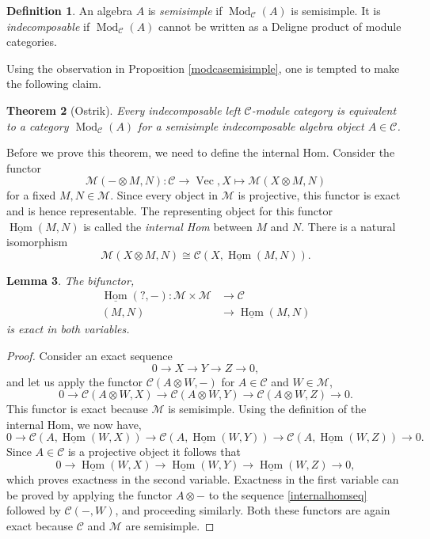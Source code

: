 \documentclass[11pt]{book}
\newtheorem{theorem}{Theorem}[section]
\newtheorem{Lem}[theorem]{Lemma}
\theoremstyle{Rem}
\theoremstyle{definition}
\newtheorem{Def}[theorem]{Definition}
\numberwithin{equation}{section}
\newcommand\ot{\otimes}
\newcommand\Vect{\operatorname{Vec}}
\newcommand\Hom{\operatorname{Hom}}
\newcommand\Mod{\operatorname{Mod}}
\newcommand\M{\mathcal{M}}
\newcommand\C{\mathcal C}
\newcommand{\ra}\rightarrow
\begin{document}
\begin{Def}
An algebra $A$ is \textit{semisimple} if $\Mod_\C(A)$ is semisimple. It is \textit{indecomposable} if $\Mod_\C(A)$ cannot be written as a Deligne product of module categories. 
\end{Def}
Using the observation in Proposition \ref{modcasemisimple}, one is tempted to make the following claim. \begin{theorem}[Ostrik]\label{Ostrik}
Every indecomposable left $\C$-module category is equivalent to a category $\Mod_\C(A)$ for a semisimple indecomposable algebra object $A\in\C$.
\end{theorem}
Before we prove this theorem, we need to define the internal Hom. 
Consider the functor \begin{equation}
	\M(-\otimes M, N): \C\rightarrow \Vect, X\mapsto \M(X\otimes M, N) 
\end{equation} for a fixed $M, N\in \M$.
Since every object in $\M$ is projective, this functor is exact and is hence representable. The representing object for this functor $\underline{\Hom}(M, N)$ is called the \textit{internal Hom} between $M$ and $N$. There is a natural isomorphism \begin{equation}
	\M(X\otimes M, N) \cong \C(X, \underline{\Hom}(M, N)).\label{internalhomiso}
\end{equation}
\begin{Lem}
 The bifunctor, \begin{align}
 \underline{\Hom} (?, -) : \M\times \M &\rightarrow \C\\
	(M, N) &\rightarrow \underline{\Hom}(M, N)
\end{align} is exact in both variables.
 \end{Lem} 
 \begin{proof}
 Consider an exact sequence \begin{equation}\label{internalhomseq}
	0\ra X\ra Y \ra Z \ra 0,
\end{equation}and let us apply the functor  $\C(A\ot W, -)$ for $A\in \C$ and $W\in \M$,
\begin{equation}
	0 \ra \C(A\ot W, X)\ra \C(A\ot W, Y) \ra \C(A\ot W, Z)\ra 0.
\end{equation}
This functor is exact because $\M$ is semisimple. Using the definition of the internal Hom, we now have, \begin{equation}
	0 \ra  \C(A,\underline{\Hom} (W, X))\ra \C(A,\underline{\Hom} (W, Y)) \ra \C(A,\underline{\Hom}(W, Z))\ra 0.
\end{equation}
Since $A\in \C$ is a projective object it follows that \begin{equation}
	0 \ra \underline{\Hom} (W, X) \ra \underline{\Hom} (W, Y) \ra \underline{\Hom}(W, Z)\ra 0,
\end{equation}
which proves exactness in the second variable.
Exactness in the first variable can be proved by applying the functor $A\ot -$ to the sequence \ref{internalhomseq} followed by $\C(-, W)$, and proceeding similarly. Both these functors are again exact because $\C$ and $\M$ are semisimple.
 \end{proof}
\end{document}

